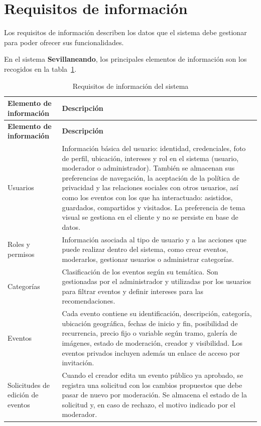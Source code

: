 \section{Requisitos de información}

Los requisitos de información describen los datos que el sistema debe gestionar para poder ofrecer sus funcionalidades.

En el sistema \textbf{Sevillaneando}, los principales elementos de información son los recogidos en la tabla~\ref{tab:requisitos_informacion}.

{\renewcommand{\arraystretch}{1.18}
\begin{longtable}{@{}>{\raggedright\arraybackslash}p{} >{\raggedright\arraybackslash}p{}@{}}
\caption{Requisitos de información del sistema}
\label{tab:requisitos_informacion}\\
\toprule
\textbf{Elemento de información} & \textbf{Descripción} \\
\midrule
\endfirsthead
\toprule
\textbf{Elemento de información} & \textbf{Descripción} \\
\midrule
\endhead
\bottomrule
\endfoot
Usuarios & Información básica del usuario: identidad, credenciales, foto de perfil, ubicación, intereses y rol en el sistema (usuario, moderador o administrador). También se almacenan sus preferencias de navegación, la aceptación de la política de privacidad y las relaciones sociales con otros usuarios, así como los eventos con los que ha interactuado: asistidos, guardados, compartidos y visitados. La preferencia de tema visual se gestiona en el cliente y no se persiste en base de datos. \\
Roles y permisos & Información asociada al tipo de usuario y a las acciones que puede realizar dentro del sistema, como crear eventos, moderarlos, gestionar usuarios o administrar categorías. \\
Categorías & Clasificación de los eventos según su temática. Son gestionadas por el administrador y utilizadas por los usuarios para filtrar eventos y definir intereses para las recomendaciones. \\
Eventos & Cada evento contiene su identificación, descripción, categoría, ubicación geográfica, fechas de inicio y fin, posibilidad de recurrencia, precio fijo o variable según tramo, galería de imágenes, estado de moderación, creador y visibilidad. Los eventos privados incluyen además un enlace de acceso por invitación. \\
Solicitudes de edición de eventos & Cuando el creador edita un evento público ya aprobado, se registra una solicitud con los cambios propuestos que debe pasar de nuevo por moderación. Se almacena el estado de la solicitud y, en caso de rechazo, el motivo indicado por el moderador. \\

\end{longtable}}

